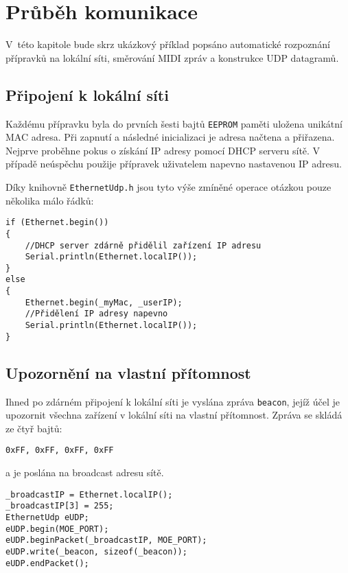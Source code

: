\chapter{Průběh komunikace}
V~této kapitole bude skrz ukázkový příklad popsáno automatické rozpoznání přípravků na lokální síti, směrování \acs{MIDI} zpráv a konstrukce UDP datagramů.

\section{Připojení k lokální síti}
Každému přípravku byla do prvních šesti bajtů \texttt{EEPROM} paměti uložena unikátní MAC adresa. Při zapnutí a následné inicializaci je adresa načtena a přiřazena. Nejprve proběhne pokus o získání IP adresy pomocí DHCP serveru sítě. V případě neúspěchu použije přípravek uživatelem napevno nastavenou IP adresu. 

Díky knihovně \texttt{EthernetUdp.h} jsou tyto výše zmíněné operace otázkou pouze několika málo řádků:
\begin{lstlisting}
if (Ethernet.begin())
{
    //DHCP server zdárně přidělil zařízení IP adresu
    Serial.println(Ethernet.localIP());
}
else
{
    Ethernet.begin(_myMac, _userIP);
    //Přidělení IP adresy napevno
    Serial.println(Ethernet.localIP());
}
\end{lstlisting}


\newcommand{\bytes}[4]{
    \begin{center}
        \large{\texttt{0x#1, 0x#2, 0x#3, 0x#4}}
    \end{center}
}



\section{Upozornění na vlastní přítomnost}
Ihned po zdárném připojení k lokální síti je vyslána zpráva  \texttt{beacon}, jejíž účel je upozornit všechna zařízení v lokální síti na vlastní přítomnost. Zpráva se skládá ze čtyř bajtů:
\bytes{FF}{FF}{FF}{FF}
a je poslána na broadcast adresu sítě.

\begin{lstlisting}
_broadcastIP = Ethernet.localIP();
_broadcastIP[3] = 255;
EthernetUdp eUDP;
eUDP.begin(MOE_PORT);
eUDP.beginPacket(_broadcastIP, MOE_PORT);
eUDP.write(_beacon, sizeof(_beacon));
eUDP.endPacket();
\end{lstlisting}



